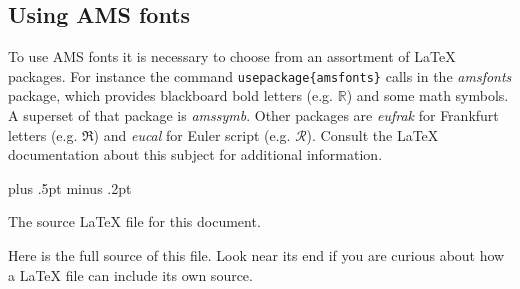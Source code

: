 \documentclass[12pt]{report} %
\theoremstyle{definition}
\theoremstyle{remark}
\newcommand{\cn}[1]{\texttt{\bslchar #1}}
\begin{document}
\subsection{Using AMS fonts}

To use AMS fonts it is necessary to choose from an assortment 
of \LaTeX{} packages. For instance the command 
\cn{usepackage\{amsfonts\}} calls in the \emph{amsfonts} package, 
which provides blackboard bold letters (e.g. $\mathbb{R}$) and 
some math symbols. A superset of that package is 
\emph{amssymb}. Other packages are \emph{eufrak} 
for Frankfurt letters (e.g. $\mathfrak{R}$)
and \emph{eucal} for Euler script 
(e.g. $\mathcal{R}$). 
Consult the \LaTeX{} documentation about this subject 
for additional information.







\baselineskip=15.5pt plus .5pt minus .2pt



\appendix
{}%

The source \LaTeX{} file for this document.

Here is the full source of this file. Look near its 
end if you are curious about how a \LaTeX{} file can 
include its own source.

\vfill



\printindex%


\nocite{*}      %


%
\end{document}
